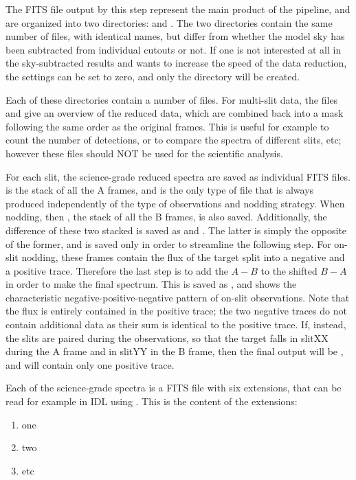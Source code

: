 \documentclass[a4paper]{article}
\begin{document}
\begin{sloppypar}
The FITS file output by this step represent the main product of the pipeline, and are organized into two directories:  and . The two directories contain the same number of files, with identical names, but differ from whether the model sky has been subtracted from individual cutouts or not. If one is not interested at all in the sky-subtracted results and wants to increase the speed of the data reduction, the settings  can be set to zero, and only the  directory will be created.

Each of these directories contain a number of files. For multi-slit data, the files  and  give an overview of the reduced data, which are combined back into a mask following the same order as the original frames. This is useful for example to count the number of detections, or to compare the spectra of different slits, etc; however these files should NOT be used for the scientific analysis.

For each slit, the science-grade reduced spectra are saved as individual FITS files.  is the stack of all the A frames, and is the only type of file that is always produced independently of the type of observations and nodding strategy. When nodding, then , the stack of all the B frames, is also saved. Additionally, the difference of these two stacked is saved as  and . The latter is simply the opposite of the former, and is saved only in order to streamline the following step. For on-slit nodding, these frames contain the flux of the target split into a negative and a positive trace. Therefore the last step is to add the $A-B$ to the shifted $B-A$ in order to make the final spectrum. This is saved as , and shows the characteristic negative-positive-negative pattern of on-slit observations. Note that the flux is entirely contained in the positive trace; the two negative traces do not contain additional data as their sum is identical to the positive trace. If, instead, the slits are paired during the observations, so that the target falls in slitXX during the A frame and in slitYY in the B frame, then the final output will be , and will contain only one positive trace.

Each of the science-grade spectra is a FITS file with six extensions, that can be read for example in IDL using . This is the content of the extensions:
\begin{enumerate}
\item one
\item two
\item etc
\end{enumerate}



\end{sloppypar}
\end{document}
